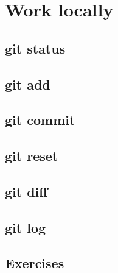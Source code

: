 \section{Work locally}
\begin{frame}[fragile]
    \slidetitle
\end{frame}

\subsection{git status}
\begin{frame}[fragile]
    \subslidetitle
\end{frame}

\subsection{git add}
\begin{frame}[fragile]
    \subslidetitle
\end{frame}

\subsection{git commit}
\begin{frame}[fragile]
    \subslidetitle
\end{frame}

\subsection{git reset}
\begin{frame}[fragile]
    \subslidetitle
\end{frame}

\subsection{git diff}
\begin{frame}[fragile]
    \subslidetitle
\end{frame}

\subsection{git log}
\begin{frame}[fragile]
    \subslidetitle
\end{frame}

\subsection{Exercises}
\begin{frame}[fragile]
  \subslidetitle
\end{frame}
